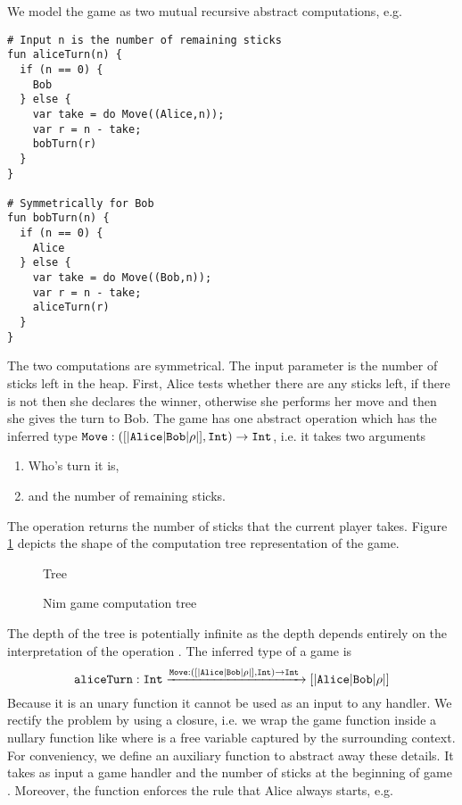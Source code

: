 We model the game as two mutual recursive abstract computations, e.g.
\begin{lstlisting}[style=links]
# Input n is the number of remaining sticks
fun aliceTurn(n) {
  if (n == 0) {
    Bob
  } else {
    var take = do Move((Alice,n));
    var r = n - take;
    bobTurn(r)
  }
}

# Symmetrically for Bob
fun bobTurn(n) {
  if (n == 0) {
    Alice
  } else {
    var take = do Move((Bob,n));
    var r = n - take;
    aliceTurn(r)
  }
}
\end{lstlisting}
The two computations are symmetrical. The input parameter  is the number of sticks left in the heap. First, Alice tests whether there are any sticks left, if there is not then she declares  the winner, otherwise she performs her move and then she gives the turn to Bob.
The game has one abstract operation  which has the inferred type $\texttt{Move} : ([|\texttt{Alice}|\texttt{Bob}|\rho|], \texttt{Int}) \to \texttt{Int}$, i.e. it takes two arguments
\begin{enumerate}
  \item Who's turn it is,
  \item and the number of remaining sticks.
\end{enumerate}
The operation  returns the number of sticks that the current player takes. Figure \ref{fig:nim-comp-tree} depicts the shape of the computation tree representation of the game.
\begin{figure}[H]
  \begin{center}
  Tree
  \end{center}
  \caption{Nim game computation tree}\label{fig:nim-comp-tree}
\end{figure}
The depth of the tree is potentially infinite as the depth depends entirely on the interpretation of the operation . The inferred type of a game is
\[ \texttt{aliceTurn}: \texttt{Int} \xrightarrow{\texttt{Move}:([|\texttt{Alice}|\texttt{Bob}|\rho|],\texttt{Int}) \to \texttt{Int}\;} [|\texttt{Alice}|\texttt{Bob}|\rho|] \]
Because it is an unary function it cannot be used as an input to any handler. We rectify the problem by using a closure, i.e. we wrap the game function inside a nullary function like  where  is a free variable captured by the surrounding context.
For conveniency, we define an auxiliary function  to abstract away these details. It takes as input a game handler  and the number of sticks at the beginning of game . Moreover, the function  enforces the rule that Alice always starts, e.g.
